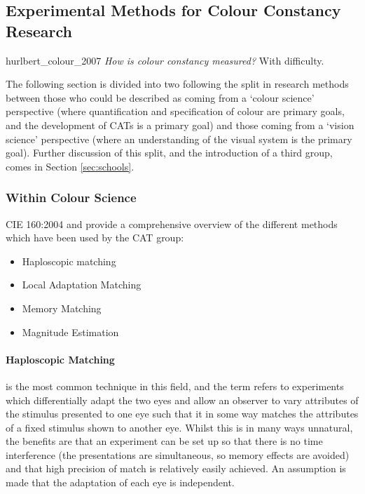 \subsection{Experimental Methods for Colour Constancy Research}

\begin{citequote}{hurlbert_colour_2007}
\emph{How is colour constancy measured?} With difficulty.
\end{citequote}

The following section is divided into two following the split in research methods between those who could be described as coming from a `colour science' perspective (where quantification and specification of colour are primary goals, and the development of \glspl{CAT} is a primary goal) and those coming from a `vision science' perspective (where an understanding of the visual system is the primary goal). Further discussion of this split, and the introduction of a third group, comes in Section \ref{sec:schools}.

\subsubsection{Within Colour Science}

CIE 160:2004 \citep{cie_tc_1-52_cie_2004} and \citet{luo_review_2000} provide a comprehensive overview of the different methods which have been used by the \gls{CAT} group:

\begin{itemize}
\item Haploscopic matching
\item Local Adaptation Matching
\item Memory Matching
\item Magnitude Estimation
\end{itemize}


\paragraph{Haploscopic Matching} is the most common technique in this field, and the term refers to experiments which differentially adapt the two eyes and allow an observer to vary attributes of the stimulus presented to one eye such that it in some way matches the attributes of a fixed stimulus shown to another eye. Whilst this is in many ways unnatural, the benefits are that an experiment can be set up so that there is no time interference (the presentations are simultaneous, so memory effects are avoided) and that high precision of match is relatively easily achieved. An assumption is made that the adaptation of each eye is independent.

